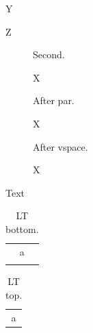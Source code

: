 \documentclass{article}
\begin{document}
\begin{minipage}{.4\textwidth}Y\par{}\end{minipage}
\begin{minipage}{.4\textwidth}Z\end{minipage}
\begin{figure}\caption{First.}\caption{Second.}\end{figure}
\begin{figure}X\par\caption{After par.}\end{figure}
\begin{figure}\vspace{2pt}\caption{After vspace.}X\end{figure}
\begin{figure}X\end{figure}
Text 
\begin{longtable}{c}a\\ \caption{LT bottom.}\end{longtable}
\begin{longtable}{c}\caption{LT top.}\\ a\\ \end{longtable}
\end{document}
